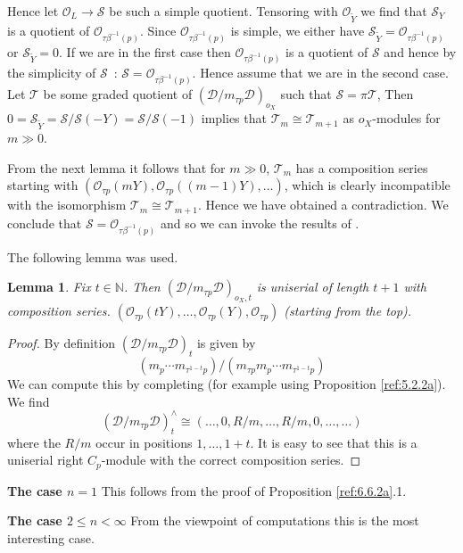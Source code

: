 \documentclass{amsproc}
\def \NN{{\mathbb N}}
\def\Dscr{{\mathcal D}}
\def\Oscr{{\mathcal O}}
\def\Sscr{{\mathcal S}}
\def\Tscr{{\mathcal T}}
\def\r{\rightarrow}
\newtheorem{lemmas}{Lemma}[subsection]
\theoremstyle{definition}
\theoremstyle{remark}
\numberwithin{equation}{section}
\numberwithin{table}{section}
\numberwithin{figure}{section}
\begin{document}
Hence let $\Oscr_L\r\Sscr$ be such a simple quotient. Tensoring with
$\Oscr_{\tilde{Y}}$ we find that $\Sscr_Y$ is a quotient of $\Oscr_{\tau
\beta^{-1}(p)}$. Since $\Oscr_{\tau \beta^{-1}(p)}$ is simple, we either
have $\Sscr_{\tilde{Y}}=\Oscr_{\tau \beta^{-1}(p)}$ or $\Sscr_{\tilde{Y}}=0$. If we are in the
first case then $\Oscr_{\tau \beta^{-1}(p)}$ is a quotient of $\Sscr$ and
hence by the simplicity of $\Sscr$~: $\Sscr=\Oscr_{\tau \beta^{-1}(p)}$.
Hence  assume that we are in the second case. Let $\Tscr$ be some
graded quotient of $(\Dscr/m_{\tau p}\Dscr)_{o_X}$ such that $\Sscr=\pi
\Tscr$, Then $0=\Sscr_{\tilde{Y}}=\Sscr/\Sscr(-Y)=\Sscr/\Sscr(-1)$
implies that $\Tscr_m\cong \Tscr_{m+1}$ as $o_X$-modules for $m\gg 0$. 




From the next lemma it follows that for $m\gg 0$, $\Tscr_m$
has a composition series starting with
$(\Oscr_{\tau p}(mY),\Oscr_{\tau p}((m-1)Y),\ldots)$, which is clearly
incompatible with the isomorphism $\Tscr_m\cong \Tscr_{m+1}$. Hence
we have  obtained a contradiction.
We conclude that $\Sscr=\Oscr_{\tau \beta^{-1} (p)}$ and so we can
  invoke the results of \cite{SmithZhang}.


The following lemma was used.
\begin{lemmas}
\label{ref:6.7.2a}
 Fix $t\in\NN$. Then  $(\Dscr/m_{\tau p}\Dscr)_{o_X,t}$
  is uniserial of length $t+1$ with composition series.
$(\Oscr_{\tau p}(tY),\ldots, \Oscr_{\tau p}(Y),\Oscr_{\tau p})$
(starting from the top).
\end{lemmas}
\begin{proof}
By definition $(\Dscr/m_{\tau p}\Dscr)_t$ is given by
\[
(m_p\cdots m_{\tau^{1-t}p})/(m_{\tau p} m_p\cdots m_{\tau^{1-t} p})
\]
We can compute this by completing (for example using Proposition
\ref{ref:5.2.2a}). We find 
\[
(\Dscr/m_{\tau
  p}\Dscr)^\wedge_t\cong(\ldots,0,R/m,\ldots,R/m,0,\ldots,\ldots)
\]
where the $R/m$ occur in positions $1,\ldots,1+t$. It is easy to see
that this is a uniserial right $C_p$-module with the correct composition
series.
\end{proof}

\medskip

\noindent
\textbf{The case { $n=1$}}
This follows from the proof of Proposition \ref{ref:6.6.2a}.1.

\medskip

\noindent
\textbf{The case { $2\le n<\infty$}}
From the viewpoint of  computations this is the most interesting case. 
\end{document}
